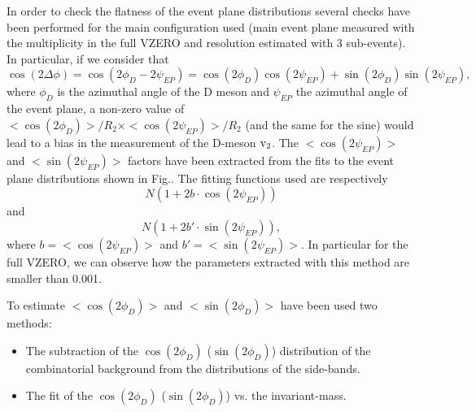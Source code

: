 In order to check the flatness of the event plane distributions several checks have been performed for the main configuration used (main event plane measured with the multiplicity in the full VZERO and resolution estimated with 3 sub-events). In particular, if we consider that
\begin{equation}
\cos(2\Delta\phi) = \cos(2\phi_D-2\psi_{EP}) = \cos(2\phi_D)\cos(2\psi_{EP})+\sin(2\phi_D)\sin(2\psi_{EP}),
\end{equation}
where $\phi_D$ is the azimuthal angle of the D meson and $\psi_{EP}$ the azimuthal angle of the event plane, a non-zero value of $< \cos(2\phi_D) >/R_2 \times < \cos(2\psi_{EP}) >/R_2$ (and the same for the sine) would lead to a bias in the measurement of the D-meson $\rm v_2$. The  $< \cos(2\psi_{EP}) >$ and $< \sin(2\psi_{EP}) >$ factors have been extracted from the fits to the event plane distributions shown in Fig.. The fitting functions used are respectively 
\begin{equation}
N(1+2b\cdot \cos(2\psi_{EP}))
\end{equation}
and 
\begin{equation}
N(1+2b'\cdot \sin(2\psi_{EP})),
\end{equation}
where $b = < \cos(2\psi_{EP}) >$ and $b' = < \sin(2\psi_{EP}) >$.
In particular for the full VZERO, we can observe how the parameters extracted with this method are smaller than 0.001.


To estimate $< \cos(2\phi_D) >$ and $< \sin(2\phi_D) >$ have been used two methods:
\begin{itemize}
\item The subtraction of the $\cos(2\phi_D)$ ($\sin(2\phi_D)$) distribution of the combinatorial background from the distributions of the side-bands.
\item The fit of the $\cos(2\phi_D)$ ($\sin(2\phi_D)$) vs. the invariant-mass.
\end{itemize}

